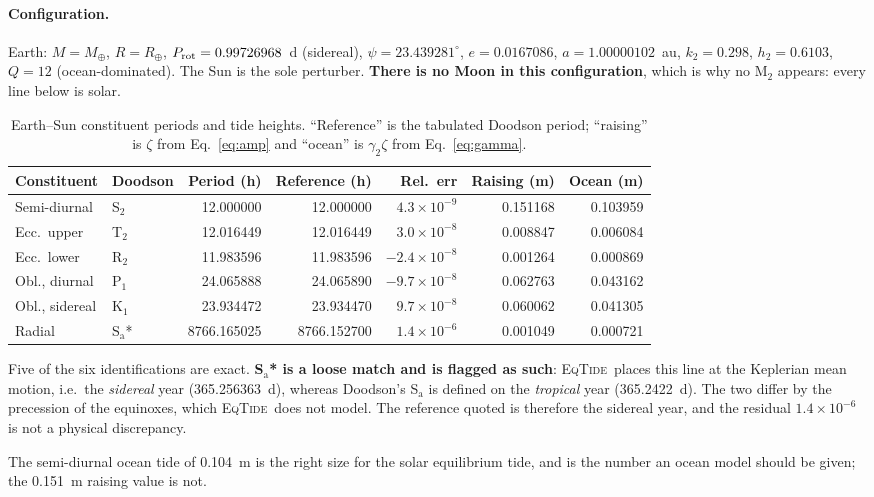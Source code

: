 \documentclass[11pt]{article}
\newcommand{\eqtide}{\textsc{EqTide}}
\begin{document}
\paragraph{Configuration.} Earth: $M=M_\oplus$, $R=R_\oplus$,
$P_{\rm rot}=0.99726968$~d (sidereal), $\psi=23.439281^\circ$, $e=0.0167086$,
$a=1.00000102$~au, $k_2=0.298$, $h_2=0.6103$, $Q=12$ (ocean-dominated). The
Sun is the sole perturber. \textbf{There is no Moon in this configuration},
which is why no M$_2$ appears: every line below is solar.

\begin{table}[h]
\centering
\caption{Earth--Sun constituent periods and tide heights. ``Reference'' is the
tabulated Doodson period; ``raising'' is $\zeta$ from Eq.~\eqref{eq:amp} and
``ocean'' is $\gamma_2\zeta$ from Eq.~\eqref{eq:gamma}.}
\label{tab:earth}
\small
\begin{tabular}{llrrrrr}
\toprule
Constituent & Doodson & Period (h) & Reference (h) & Rel.\ err &
Raising (m) & Ocean (m) \\
\midrule
Semi-diurnal & S$_2$ & 12.000000 & 12.000000 & $4.3\times10^{-9}$ & 0.151168 & 0.103959 \\
Ecc.\ upper  & T$_2$ & 12.016449 & 12.016449 & $3.0\times10^{-8}$ & 0.008847 & 0.006084 \\
Ecc.\ lower  & R$_2$ & 11.983596 & 11.983596 & $-2.4\times10^{-8}$ & 0.001264 & 0.000869 \\
Obl., diurnal & P$_1$ & 24.065888 & 24.065890 & $-9.7\times10^{-8}$ & 0.062763 & 0.043162 \\
Obl., sidereal & K$_1$ & 23.934472 & 23.934470 & $9.7\times10^{-8}$ & 0.060062 & 0.041305 \\
Radial & S$_\mathrm{a}$* & 8766.165025 & 8766.152700 & $1.4\times10^{-6}$ & 0.001049 & 0.000721 \\
\bottomrule
\end{tabular}
\end{table}

Five of the six identifications are exact. \textbf{S$_\mathrm{a}$* is a loose
match and is flagged as such}: \eqtide\ places this line at the Keplerian mean
motion, i.e.\ the \emph{sidereal} year (365.256363~d), whereas Doodson's
S$_\mathrm{a}$ is defined on the \emph{tropical} year (365.2422~d). The two
differ by the precession of the equinoxes, which \eqtide\ does not model. The
reference quoted is therefore the sidereal year, and the residual
$1.4\times10^{-6}$ is not a physical discrepancy.

The semi-diurnal ocean tide of 0.104~m is the right size for the solar
equilibrium tide, and is the number an ocean model should be given; the
0.151~m raising value is not.
\end{document}
